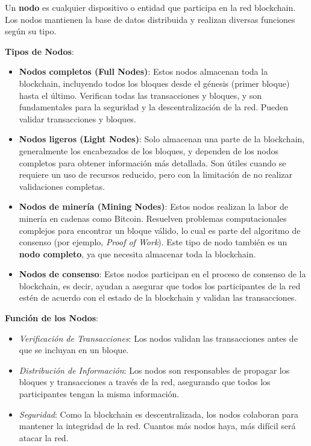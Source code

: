 Un \textbf{nodo} es cualquier dispositivo o entidad que participa en la red blockchain. Los nodos mantienen la base de datos distribuida y realizan diversas funciones según su tipo.

\textbf{Tipos de Nodos}:
\begin{itemize}
    \item \textbf{Nodos completos (Full Nodes)}: Estos nodos almacenan toda la blockchain, incluyendo todos los bloques desde el génesis (primer bloque) hasta el último. Verifican todas las transacciones y bloques, y son fundamentales para la seguridad y la descentralización de la red. Pueden validar transacciones y bloques.
    \item \textbf{Nodos ligeros (Light Nodes)}: Solo almacenan una parte de la blockchain, generalmente los encabezados de los bloques, y dependen de los nodos completos para obtener información más detallada. Son útiles cuando se requiere un uso de recursos reducido, pero con la limitación de no realizar validaciones completas.
    \item \textbf{Nodos de minería (Mining Nodes)}: Estos nodos realizan la labor de minería en cadenas como Bitcoin. Resuelven problemas computacionales complejos para encontrar un bloque válido, lo cual es parte del algoritmo de consenso (por ejemplo, \textit{Proof of Work}). Este tipo de nodo también es un \textbf{nodo completo}, ya que necesita almacenar toda la blockchain.
    \item \textbf{Nodos de consenso}: Estos nodos participan en el proceso de consenso de la blockchain, es decir, ayudan a asegurar que todos los participantes de la red estén de acuerdo con el estado de la blockchain y validan las transacciones.
\end{itemize}

\textbf{Función de los Nodos}:
\begin{itemize}
    \item \textit{Verificación de Transacciones}: Los nodos validan las transacciones antes de que se incluyan en un bloque.
    \item \textit{Distribución de Información}: Los nodos son responsables de propagar los bloques y transacciones a través de la red, asegurando que todos los participantes tengan la misma información.
    \item \textit{Seguridad}: Como la blockchain es descentralizada, los nodos colaboran para mantener la integridad de la red. Cuantos más nodos haya, más difícil será atacar la red.
\end{itemize}

